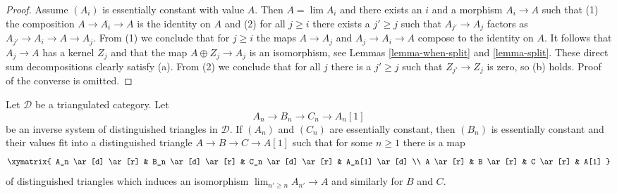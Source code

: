 \begin{proof}
Assume $(A_i)$ is essentially constant with value $A$. Then $A = \lim A_i$
and there exists an $i$ and a morphism $A_i \to A$ such that (1)
the composition $A \to A_i \to A$ is the identity on $A$ and (2) for all
$j \geq i$ there exists a $j' \geq j$ such that $A_{j'} \to A_j$ factors as
$A_{j'} \to A_i \to A \to A_j$. From (1) we conclude that for $j \geq i$
the maps $A \to A_j$ and $A_j \to A_i \to A$ compose to the identity on $A$.
It follows that $A_j \to A$ has a kernel $Z_j$ and that
the map $A \oplus Z_j \to A_j$ is an isomorphism, see
Lemmas \ref{lemma-when-split} and \ref{lemma-split}.
These direct sum decompositions clearly satisfy (a).
From (2) we conclude that for all $j$ there is a $j' \geq j$ such that
$Z_{j'} \to Z_j$ is zero, so (b) holds. Proof of the converse is omitted.
\end{proof}

\begin{lemma}
\label{lemma-essentially-constant-2-out-of-3}
Let $\mathcal{D}$ be a triangulated category. Let
$$
A_n \to B_n \to C_n \to A_n[1]
$$
be an inverse system of distinguished triangles in $\mathcal{D}$.
If $(A_n)$ and $(C_n)$ are essentially constant, then
$(B_n)$ is essentially constant and their values fit into
a distinguished triangle $A \to B \to C \to A[1]$ such that for
some $n \geq 1$ there is a map
$$
\xymatrix{
A_n \ar[d] \ar[r] &
B_n \ar[d] \ar[r] &
C_n \ar[d] \ar[r] &
A_n[1] \ar[d] \\
A \ar[r] &
B \ar[r] &
C \ar[r] &
A[1]
}
$$
of distinguished triangles which induces an isomorphism
$\lim_{n' \geq n} A_{n'} \to A$ and similarly for $B$ and $C$.
\end{lemma}


